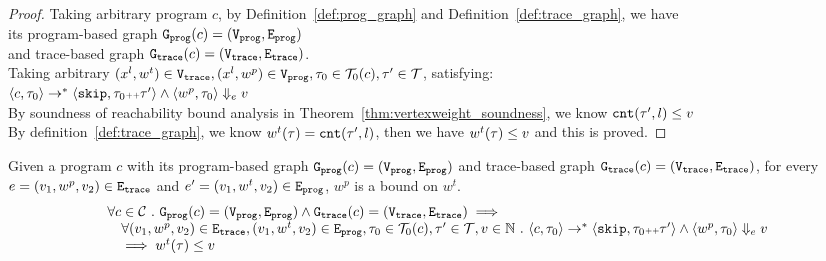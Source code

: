 \begin{proof}
Taking arbitrary program $c$,
by Definition~\ref{def:prog_graph} and Definition~\ref{def:trace_graph}, 
we have   
\\
its program-based graph $\mathtt{{G_{prog}}}({c}) = (\mathtt{{V_{prog}}}, \mathtt{{E_{prog}}})$ 
\\
and 
trace-based graph $\mathtt{{G_{trace}}}({c}) = (\mathtt{{V_{trace}}}, \mathtt{{E_{trace}}})$.
\\
Taking arbitrary 
$(x^l, w^{t}) \in \mathtt{{V_{trace}}}, (x^l, w^{p}) \in \mathtt{{V_{prog}}}, \mathtt{\tau}_0 \in \mathcal{T}_0(c), \mathtt{\tau}' \in \mathcal{T}$, satisfying:
\\
$\langle {c}, \mathtt{\tau}_0 \rangle \to^{*} \langle \mathtt{skip}, \mathtt{\tau}_0 {\scriptscriptstyle ++}\mathtt{\tau}' \rangle 
\land 
\langle w^{p}, \mathtt{\tau}_0 \rangle \Downarrow_e v$
\\
By soundness of reachability bound analysis in Theorem~\ref{thm:vertexweight_soundness}, we know 
$\mathtt{cnt}(\mathtt{\tau}', l) \leq v$
\\
By definition~\ref{def:trace_graph}, we know $w^t(\mathtt{\tau}) = \mathtt{cnt}(\mathtt{\tau}', l)$,
then we have $w^t(\mathtt{\tau}) \leq v$ and this is proved.
\end{proof}
%
\begin{lem}
	\label{lem:edgeweights_map}
	Given a program $c$ with its
	program-based graph $\mathtt{{G_{prog}}}({c}) = (\mathtt{{V_{prog}}}, \mathtt{{E_{prog}}})$
	and 
	trace-based graph $\mathtt{{G_{trace}}}({c}) = (\mathtt{{V_{trace}}}, \mathtt{{E_{trace}}})$,
	for every $e = (v_1, w^p, v_2) \in \mathtt{{E_{trace}}}$ and
	$e' = (v_1, w^t, v_2) \in \mathtt{{E_{prog}}}$, 
	$w^{p}$ is a bound on $w^t$.
	\[
		\begin{array}{l}
			\forall c \in \mathcal{C} 
			 ~.~  
			 \mathtt{{G_{prog}}}({c}) = (\mathtt{{V_{prog}}}, \mathtt{{E_{prog}}})
			\land 
			\mathtt{{G_{trace}}}({c}) = (\mathtt{{V_{trace}}}, \mathtt{{E_{trace}}})
			\implies
			\\ \quad
			\forall (v_1, w^p, v_2) \in \mathtt{{E_{trace}}},
			(v_1, w^t, v_2) \in \mathtt{{E_{prog}}}, 
			\mathtt{\tau}_0 \in \mathcal{T}_0(c), 
			\mathtt{\tau}' \in \mathcal{T}, v \in \mathbb{N} ~.~ 
			\langle {c}, \mathtt{\tau}_0 \rangle \to^{*} \langle \mathtt{skip}, \mathtt{\tau}_0 {\scriptscriptstyle ++}\mathtt{\tau}' \rangle 
			\land 
			\langle w^{p}, \mathtt{\tau}_0 \rangle \Downarrow_e v
			\\ \quad
			\implies
			w^{t}(\mathtt{\tau}) \leq v
		\end{array}
		\]
	\end{lem}
